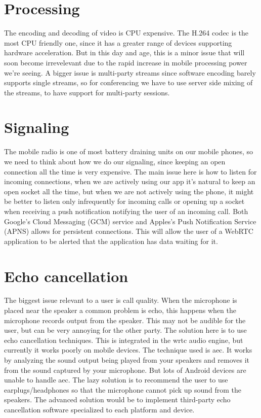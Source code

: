 \section{Processing}
The encoding and decoding of video is CPU expensive. The H.264 codec is the most CPU friendly one, since it has a greater range of devices supporting hardware acceleration. But in this day and age, this is a minor issue that will soon become irrevelevant due to the rapid increase in mobile processing power we're seeing\cite{moores-law}. A bigger issue is multi-party streams since software encoding barely supports single streams\cite{webrtc-mobile-slides}, so for conferencing we have to use server side mixing of the streams, to have support for multi-party sessions.


\section{Signaling}
The mobile radio is one of most battery draining units on our mobile phones, so we need to think about how we do our signaling, since keeping an open connection all the time is very expensive. The main issue here is how to listen for incoming connections, when we are actively using our app it's natural to keep an open socket all the time, but when we are not actively using the phone, it might be better to listen only infrequently for incoming calls or opening up a socket when receiving a push notification notifying the user of an incoming call. Both Google's Cloud Messaging (GCM) service and Apples's Push Notification Service (APNS) allows for persistent connections. This will allow the user of a WebRTC application to be alerted that the application has data waiting for it.


\section{Echo cancellation}
The biggest issue relevant to a user is call quality. When the microphone is placed near the speaker a common problem is echo, this happens when the microphone records output from the speaker. This may not be audible for the user, but can be very annoying for the other party. The solution here is to use echo cancellation techniques. This is integrated in the \gls{wrtc} audio engine, but currently it works poorly on mobile devices. The technique used is \gls{aec}. It works by analyzing the sound output being played from your speakers and removes it from the sound captured by your microphone. But lots of Android devices are unable to handle \gls{aec}\cite{echo-problems-mobile}. The lazy solution is to recommend the user to use earplugs/headphones so that the microphone cannot pick up sound from the speakers. The advanced solution would be to implement third-party echo cancellation software specialized to each platform and device.


